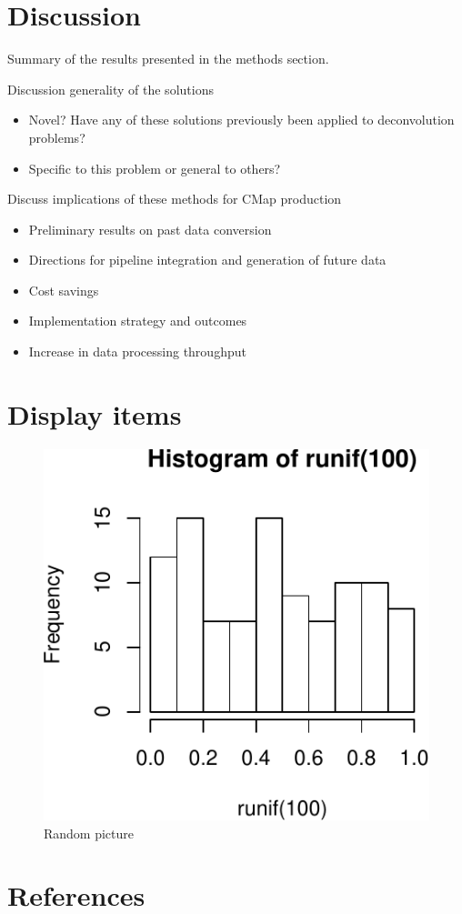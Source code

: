 \documentclass[]{article}
\providecommand{\tightlist}{%
  \setlength{\itemsep}{0pt}\setlength{\parskip}{0pt}}
\begin{document}
\hypertarget{discussion}{%
\section{Discussion}\label{discussion}}

Summary of the results presented in the methods section.

Discussion generality of the solutions

\begin{itemize}
\tightlist
\item
  Novel? Have any of these solutions previously been applied to
  deconvolution problems?
\item
  Specific to this problem or general to others?
\end{itemize}

Discuss implications of these methods for CMap production

\begin{itemize}
\tightlist
\item
  Preliminary results on past data conversion
\item
  Directions for pipeline integration and generation of future data
\item
  Cost savings
\item
  Implementation strategy and outcomes
\item
  Increase in data processing throughput
\end{itemize}

\hypertarget{display-items}{%
\section{Display items}\label{display-items}}

\begin{figure}
\centering
\includegraphics{main_files/figure-latex/random-1.pdf}
\caption{\label{pic1}Random picture}
\end{figure}

\hypertarget{references}{%
\section{References}\label{references}}
\end{document}
